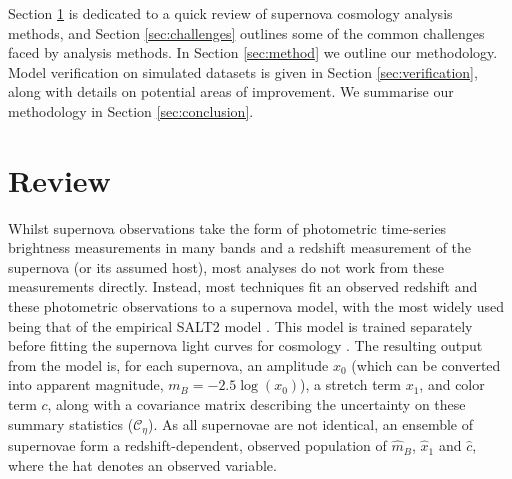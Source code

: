 \documentclass[a4paper,fleqn,usenatbib,manuscript]{emulateapj}
\begin{document}
Section \ref{sec:review} is dedicated to a quick review of supernova cosmology analysis methods, and Section \ref{sec:challenges} outlines some of the common challenges faced by analysis methods. In Section \ref{sec:method} we outline our methodology. Model verification on simulated datasets is given in Section \ref{sec:verification}, along with details on potential areas of improvement. We summarise our methodology in Section \ref{sec:conclusion}.



\section{Review}
\label{sec:review}

Whilst supernova observations take the form of photometric time-series brightness measurements in many bands and a redshift measurement of the supernova (or its assumed host), most analyses do not work from these measurements directly. Instead, most techniques fit an observed redshift and these photometric observations to a supernova model, with the most widely used being that of the empirical SALT2 model \citep{Guy2007, Guy2010}. This model is trained separately before fitting the supernova light curves for cosmology \citep{Guy2010, Betoule2014}. The resulting output from the model is, for each supernova, an amplitude $x_0$ (which can be converted into apparent magnitude, $m_B = -2.5\log(x_0)$), a stretch term $x_1$, and color term $c$, along with a covariance matrix describing the uncertainty on these summary statistics ($\mathcal{C_\eta}$). As all supernovae are not identical, an ensemble of supernovae form a redshift-dependent, observed population of $\hat{m}_B$, $\hat{x}_1$ and $\hat{c}$, where the hat denotes an observed variable.
\end{document}
